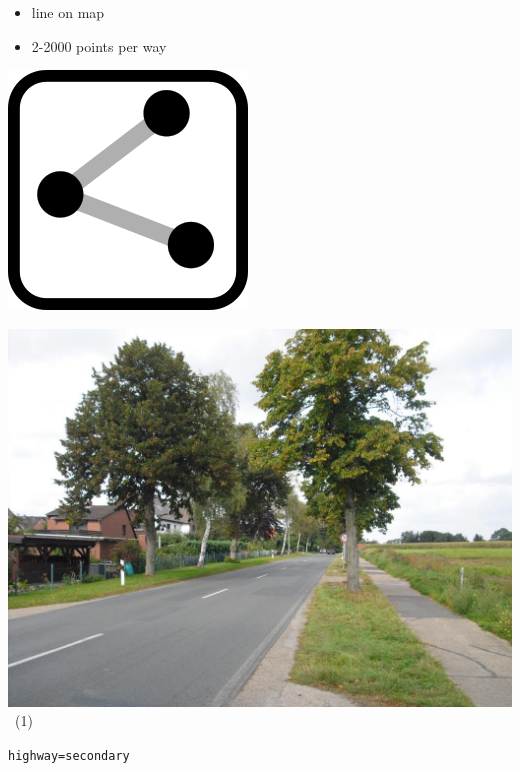 \documentclass{beamer}
\begin{document}
	\begin{frame}
		\begin{itemize}
			\item line on map
			\item 2-2000 points per way
		\end{itemize}
		
		\vfill
		
		\begin{center}
			\begin{minipage}[b][0.6\textheight][c]{0.2\linewidth}
				\centering
				\includegraphics[width=0.5\linewidth,height=0.5\textheight,keepaspectratio]{images/240px-Mf_way.png}
			\end{minipage}
			\begin{minipage}[b][0.6\textheight][c]{0.4\linewidth}
				\centering
				\includegraphics[width=0.8\linewidth,height=0.8\textheight,keepaspectratio]{images/Meyenburg-L134.jpg}~\tiny{(1)}
			\end{minipage}
			\begin{minipage}[b][0.6\textheight][c]{0.3\linewidth}
				\texttt{highway=secondary}
				\begin{center}

\end{center}
\end{minipage}
\end{center}
\end{frame}
\end{document}
